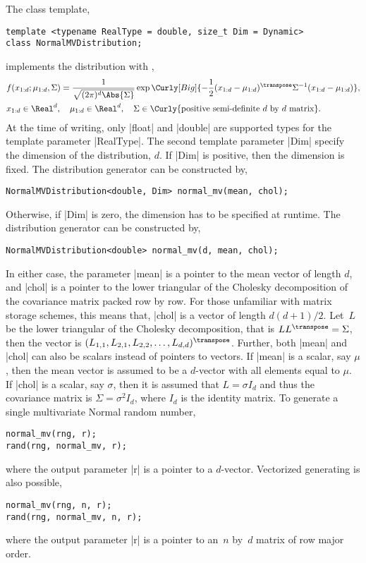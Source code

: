 The class template,
\begin{verbatim}
template <typename RealType = double, size_t Dim = Dynamic>
class NormalMVDistribution;
\end{verbatim}
implements the distribution with \pdf,
\begin{align*}
  &f(x_{1:d};\mu_{1:d},\Sigma) = \frac{1}{\sqrt{(2\pi)^d\Abs{\Sigma}}}
  \exp\Curly[Big]{-\frac{1}{2}(x_{1:d} -
  \mu_{1:d})^{\transpose}\Sigma^{-1}(x_{1:d} - \mu_{1:d})},\\
  &x_{1:d}\in\Real^d,\quad
  \mu_{1:d}\in\Real^d,\quad
  \Sigma\in
  \Curly{\text{positive semi-definite }d\text{ by }d\text{ matrix}}.
\end{align*}
At the time of writing, only |float| and |double| are supported types for the
template parameter |RealType|. The second template parameter |Dim| specify the
dimension of the distribution, $d$. If |Dim| is positive, then the dimension is
fixed. The distribution generator can be constructed by,
\begin{verbatim}
NormalMVDistribution<double, Dim> normal_mv(mean, chol);
\end{verbatim}
Otherwise, if |Dim| is zero, the dimension has to be specified at runtime. The
distribution generator can be constructed by,
\begin{verbatim}
NormalMVDistribution<double> normal_mv(d, mean, chol);
\end{verbatim}
In either case, the parameter |mean| is a pointer to the mean vector of length
$d$, and |chol| is a pointer to the lower triangular of the Cholesky
decomposition of the covariance matrix packed row by row. For those unfamiliar
with matrix storage schemes, this means that, |chol| is a vector of length
$d(d + 1) / 2$. Let~$L$ be the lower triangular of the Cholesky decomposition,
that is $LL^{\transpose} = \Sigma$, then the vector is
$(L_{1,1},L_{2,1},L_{2,2},\dots,L_{d,d})^{\transpose}$. Further, both |mean|
and |chol| can also be scalars instead of pointers to vectors. If |mean| is a
scalar, say $\mu$, then the mean vector is assumed to be a $d$-vector with all
elements equal to $\mu$. If |chol| is a scalar, say $\sigma$, then it is
assumed that $L = \sigma I_d$ and thus the covariance matrix is $\Sigma =
\sigma^2 I_d$, where $I_d$ is the identity matrix. To generate a single
multivariate Normal random number,
\begin{verbatim}
normal_mv(rng, r);
rand(rng, normal_mv, r);
\end{verbatim}
where the output parameter |r| is a pointer to a $d$-vector. Vectorized
generating is also possible,
\begin{verbatim}
normal_mv(rng, n, r);
rand(rng, normal_mv, n, r);
\end{verbatim}
where the output parameter |r| is a pointer to an~$n$ by~$d$ matrix of row
major order.
